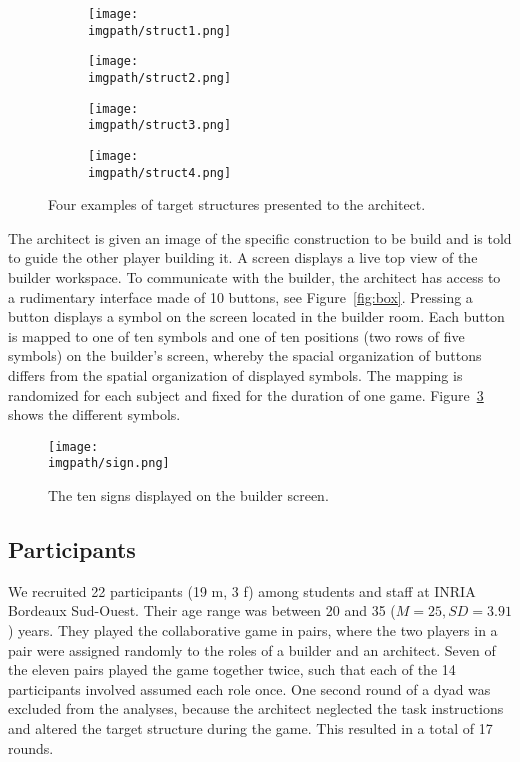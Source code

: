 \begin{figure}[!ht]
    \centering
    \begin{subfigure}[b]{0.49\columnwidth}
          \centering
          \texttt{[image: \\imgpath/struct1.png]}
    \end{subfigure}
    \begin{subfigure}[b]{0.49\columnwidth}
          \centering
          \texttt{[image: \\imgpath/struct2.png]}
    \end{subfigure}
    \begin{subfigure}[b]{0.49\columnwidth}
          \centering
          \texttt{[image: \\imgpath/struct3.png]}
          \label{fig:sc}
    \end{subfigure}
    \begin{subfigure}[b]{0.49\columnwidth}
          \centering
          \texttt{[image: \\imgpath/struct4.png]}
    \end{subfigure}
    \caption{Four examples of target structures presented to the architect.} 
    \label{fig:structures}
\end{figure}

The architect is given an image of the specific construction to be build and is told to guide the other player building it. A screen displays a live top view of the builder workspace. To communicate with the builder, the architect has access to a rudimentary interface made of 10 buttons, see Figure~\ref{fig:box}. Pressing a button displays a symbol on the screen located in the builder room. Each button is mapped to one of ten symbols and one of ten positions (two rows of five symbols) on the builder's screen, whereby the spacial organization of buttons differs from the spatial organization of displayed symbols. The mapping is randomized for each subject and fixed for the duration of one game. Figure~\ref{fig:sign} shows the different symbols.

\begin{figure}[!ht]
\centering
\texttt{[image: \\imgpath/sign.png]}%
\caption{The ten signs displayed on the builder screen.}
\label{fig:sign}
\end{figure}

\subsection{Participants}

We recruited 22 participants (19 m, 3 f) among students and staff at INRIA Bordeaux Sud-Ouest. Their age range was between 20 and 35 ($M = 25, SD = 3.91$) years. They played the collaborative game in pairs, where the two players in a pair were assigned randomly to the roles of a builder and an architect. Seven of the eleven pairs played the game together twice, such that each of the 14 participants involved assumed each role once. One second round of a dyad was excluded from the analyses, because the architect neglected the task instructions and altered the target structure during the game. This resulted in a total of 17 rounds.

